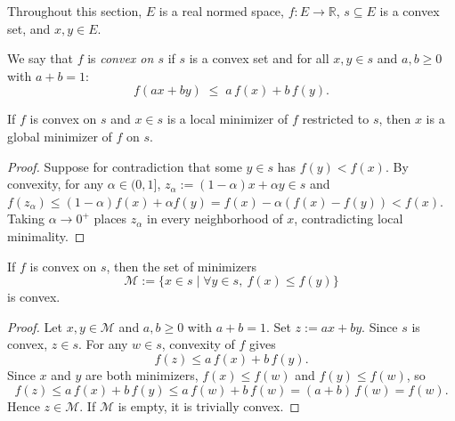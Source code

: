 Throughout this section, $E$ is a real normed space, $f : E \to \mathbb{R}$,
$s \subseteq E$ is a convex set, and $x, y \in E$.


\begin{definition}\label{def:convex_fn}
  \leanok{}
  \uses{}
  We say that $f$ is \emph{convex on $s$} if $s$ is a convex set and for all $x, y \in s$
  and $a, b \ge 0$ with $a + b = 1$:
  \[
    f(a x + b y) \;\le\; a\,f(x) + b\,f(y).
  \]
\end{definition}


\begin{theorem}\label{thm:local_min_is_global_convex}
  \leanok{}
  \uses{}
  If $f$ is convex on $s$ and $x \in s$ is a local minimizer of $f$ restricted to $s$,
  then $x$ is a global minimizer of $f$ on $s$.
\end{theorem}
\begin{proof}
  \leanok{}
  Suppose for contradiction that some $y\in s$ has $f(y)<f(x)$. By convexity, for any
  $\alpha\in(0,1]$, $z_\alpha := (1-\alpha)x+\alpha y\in s$ and
  $f(z_\alpha)\le(1-\alpha)f(x)+\alpha f(y) = f(x) - \alpha(f(x)-f(y)) < f(x)$.
  Taking $\alpha\to 0^+$ places $z_\alpha$ in every neighborhood of $x$, contradicting local
  minimality.
\end{proof}

\begin{theorem}\label{thm:minimizers_set_convex}
  \leanok{}
  \uses{}
  If $f$ is convex on $s$, then the set of minimizers
  \[
    \mathcal{M} := \{x \in s \mid \forall y \in s,\ f(x) \le f(y)\}
  \]
  is convex.
\end{theorem}

\begin{proof}
  \leanok{}
  Let $x, y \in \mathcal{M}$ and $a, b \ge 0$ with $a + b = 1$. Set $z := ax + by$.
  Since $s$ is convex, $z \in s$. For any $w \in s$, convexity of $f$ gives
  \[
    f(z) \le a\,f(x) + b\,f(y).
  \]
  Since $x$ and $y$ are both minimizers, $f(x) \le f(w)$ and $f(y) \le f(w)$, so
  \[
    f(z) \le a\,f(x) + b\,f(y) \le a\,f(w) + b\,f(w) = (a+b)\,f(w) = f(w).
  \]
  Hence $z \in \mathcal{M}$. If $\mathcal{M}$ is empty, it is trivially convex.
\end{proof}

